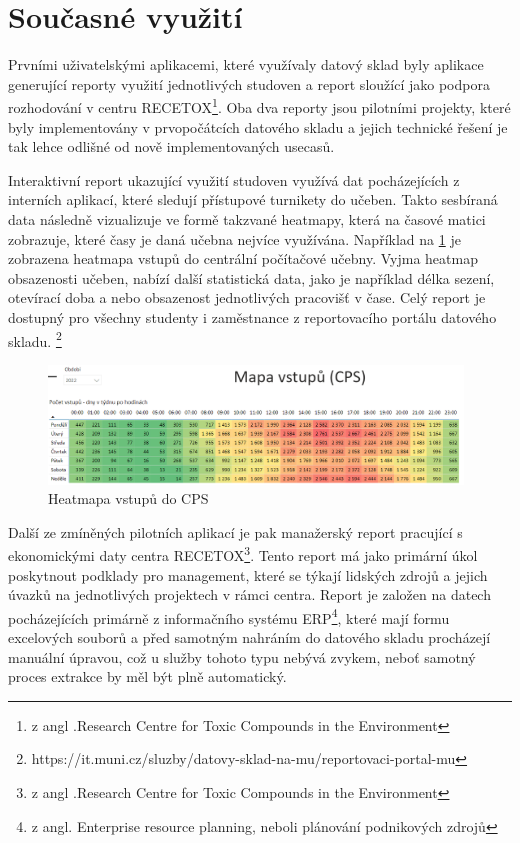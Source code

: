 \documentclass[
  digital,     %
  twoside,     %
  lof,         %
  lot,         %
]{fithesis4}
\begin{document}
\section{Současné využití}
Prvními uživatelskými aplikacemi, které využívaly datový sklad byly aplikace generující reporty využití jednotlivých studoven a report sloužící jako podpora rozhodování v centru RECETOX\footnote{z angl .Research Centre for Toxic Compounds in the Environment}. Oba dva reporty jsou pilotními projekty, které byly implementovány v prvopočátcích datového skladu a jejich technické řešení je tak lehce odlišné od nově implementovaných usecasů. 

Interaktivní report ukazující využití studoven využívá dat pocházejících z interních aplikací, které sledují přístupové turnikety do učeben. Takto sesbíraná data následně vizualizuje ve formě takzvané heatmapy, která na časové matici zobrazuje, které časy je daná učebna nejvíce využívána. Například na \ref{fig:cps} je zobrazena heatmapa vstupů do centrální počítačové učebny. Vyjma heatmap obsazenosti učeben, nabízí další statistická data, jako je například délka sezení, otevírací doba a nebo obsazenost jednotlivých pracovišť v čase. Celý report je dostupný pro všechny studenty i zaměstnance z reportovacího portálu datového skladu. \footnote{https://it.muni.cz/sluzby/datovy-sklad-na-mu/reportovaci-portal-mu}

    \begin{figure}[t]
        \begin{center}
            \includegraphics[width=11cm]{img/ucebny.png}
        \end{center}
        \caption{Heatmapa vstupů do CPS}
        \label{fig:cps}
    \end{figure} 
 
Další ze zmíněných pilotních aplikací je pak manažerský report pracující s ekonomickými daty centra RECETOX\footnote{z angl .Research Centre for Toxic Compounds in the Environment}. Tento report má jako primární úkol poskytnout podklady pro management, které se týkají lidských zdrojů a jejich úvazků na jednotlivých projektech v rámci centra. Report je  založen na datech pocházejících primárně z informačního systému ERP\footnote{z angl. Enterprise resource planning, neboli plánování podnikových zdrojů}, které mají formu excelových souborů a před samotným nahráním do datového skladu procházejí manuální úpravou, což u služby tohoto typu nebývá zvykem, neboť samotný proces extrakce by měl být plně automatický. 
\end{document}
